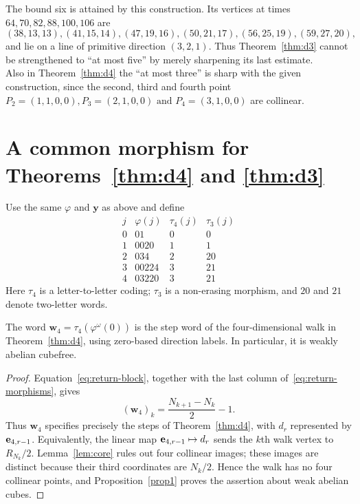 \documentclass[12pt,reqno]{article}
\begin{document}
\begin{remark}
The bound six is attained by this construction.  Its vertices at times
$64,70,82,88,100,106$ are
\[
(38,13,13),(41,15,14),(47,19,16),(50,21,17),(56,25,19),(59,27,20),
\]
and lie on a line of primitive direction $(3,2,1)$. Thus Theorem~\ref{thm:d3}
cannot be strengthened to ``at most five'' by merely sharpening its last
estimate.\\
Also in Theorem~\ref{thm:d4} the ``at most three'' is sharp with the given construction, since the second, third and fourth point $P_2=(1,1,0,0),
P_3=(2,1,0,0) \mbox { and }
P_4=(3,1,0,0)$ are collinear.
\end{remark}


\section{A common morphism for Theorems~\ref{thm:d4} and \ref{thm:d3}}\label{sec5}


Use the same $\varphi$ and $\mathbf y$ as above and define
\begin{equation}\label{eq:codings}
\begin{array}{c|c|c|c}
 j&\varphi(j)&\tau_4(j)&\tau_3(j)\\ \hline
 0&01&0&0\\
 1&0020&1&1\\
 2&034&2&20\\
 3&00224&3&21\\
 4&03220&3&21
\end{array}
\end{equation}
Here $\tau_4$ is a letter-to-letter coding; $\tau_3$ is a non-erasing
morphism, and $20$ and $21$ denote two-letter words.

\begin{corollary}
The word $\mathbf w_4=\tau_4(\varphi^\omega(0))$ is the step word of
the four-dimensional walk in Theorem~\ref{thm:d4}, using zero-based direction
labels. In particular, it is weakly abelian cubefree.
\end{corollary}

\begin{proof}
Equation~\eqref{eq:return-block}, together with the last column
of~\eqref{eq:return-morphisms}, gives
\[
 (\mathbf w_4)_k=\frac{N_{k+1}-N_k}{2}-1.
\]
Thus $\mathbf w_4$ specifies precisely the steps of Theorem~\ref{thm:d4}, with
$d_r$ represented by ${\bf e}_{4,r-1}$. Equivalently, the linear map
${\bf e}_{4,r-1}\mapsto d_r$ sends the $k$th walk vertex to
$R_{N_k}/2$. Lemma~\ref{lem:core} rules out four collinear images; these images
are distinct because their third coordinates are $N_k/2$.
Hence the walk has no four collinear points, and Proposition~\ref{prop1}
proves the assertion about weak abelian cubes.
\end{proof}
\end{document}
